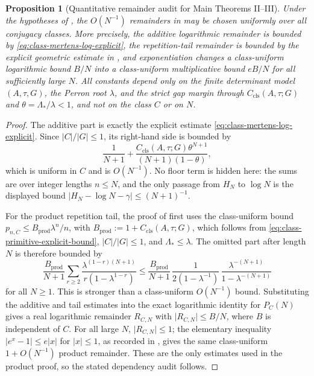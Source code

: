 \documentclass[11pt,a4paper]{amsart}
\theoremstyle{plain}
\newtheorem{proposition}[theorem]{Proposition}
\theoremstyle{definition}
\theoremstyle{remark}
\newcommand{\abs}[1]{\lvert #1 \rvert}
\begin{document}
\begin{proposition}[Quantitative remainder audit for Main Theorems II--III]
  \label{prop:main-ii-iii-remainder-audit}
  Under the hypotheses of , the
  \(O(N^{-1})\) remainders in
   may be
  chosen uniformly over all conjugacy classes.  More precisely, the additive
  logarithmic remainder is bounded by
  \eqref{eq:class-mertens-log-explicit}, the repetition-tail remainder is
  bounded by the explicit geometric estimate in
  , and exponentiation changes a
  class-uniform logarithmic bound \(B/N\) into a class-uniform multiplicative
  bound \(eB/N\) for all sufficiently large \(N\).  All constants depend only
  on the finite determinant model \((A,\tau,G)\), the Perron root \(\lambda\),
  and the strict gap margin through \(C_{\mathrm{cls}}(A,\tau;G)\) and
  \(\theta=\Lambda_*/\lambda<1\), and not on the class \(C\) or on \(N\).
\end{proposition}

\begin{proof}
  The additive part is exactly the explicit estimate
  \eqref{eq:class-mertens-log-explicit}.  Since \(|C|/|G|\le1\), its right-hand
  side is bounded by
  \[
    \frac{1}{N+1}
    +
    \frac{C_{\mathrm{cls}}(A,\tau;G)\theta^{N+1}}
      {(N+1)(1-\theta)},
  \]
  which is uniform in \(C\) and is \(O(N^{-1})\).  No floor term is hidden here:
  the sums are over integer lengths \(n\le N\), and the only passage from
  \(H_N\) to \(\log N\) is the displayed bound
  \(\abs{H_N-\log N-\gamma}\le (N+1)^{-1}\).

  For the product repetition tail, the proof of
   first uses the class-uniform bound
  \(p_{n,C}\le B_{\mathrm{prod}}\lambda^n/n\), with
  \(B_{\mathrm{prod}}:=1+C_{\mathrm{cls}}(A,\tau;G)\), which follows from
  \eqref{eq:class-primitive-explicit-bound}, \(|C|/|G|\le1\), and
  \(\Lambda_*\le\lambda\).  The omitted part after length \(N\) is therefore
  bounded by
  \[
    \frac{B_{\mathrm{prod}}}{N+1}
    \sum_{r\ge2}\frac{\lambda^{(1-r)(N+1)}}{r(1-\lambda^{1-r})}
    \le
    \frac{B_{\mathrm{prod}}}{N+1}\,
    \frac{1}{2(1-
    \lambda^{-1})}\,
    \frac{\lambda^{-(N+1)}}{1-\lambda^{-(N+1)}}
  \]
  for all \(N\ge1\).  This is stronger than a class-uniform
  \(O(N^{-1})\) bound.  Substituting the additive and tail estimates into the
  exact logarithmic identity for \(P_C(N)\) gives a real logarithmic remainder
  \(R_{C,N}\) with \(\abs{R_{C,N}}\le B/N\), where \(B\) is independent of
  \(C\).  For all large \(N\), \(\abs{R_{C,N}}\le1\); the elementary inequality
  \(\abs{e^x-1}\le e\abs{x}\) for \(\abs{x}\le1\), as recorded in
  , gives the same
  class-uniform \(1+O(N^{-1})\) product remainder.  These are the only estimates
  used in the product proof, so the stated dependency audit follows.
\end{proof}
\end{document}

